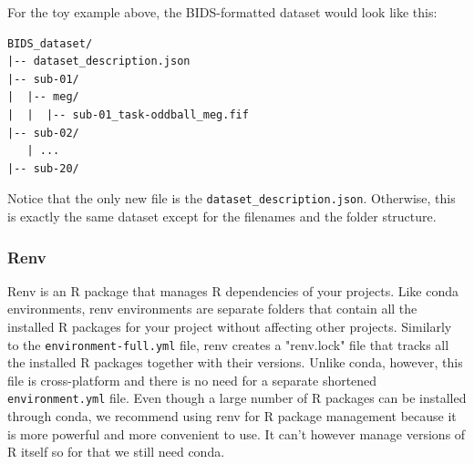 \documentclass[a4paper,man,floatsintext,natbib]{apa6}
\begin{document}
For the toy example above, the BIDS-formatted dataset would look like this:

\begin{verbatim}
BIDS_dataset/
|-- dataset_description.json
|-- sub-01/
|  |-- meg/
|  |  |-- sub-01_task-oddball_meg.fif
|-- sub-02/
   | ...
|-- sub-20/
\end{verbatim}

Notice that the only new file is the \verb|dataset_description.json|. Otherwise, this is exactly the same dataset except for the filenames and the folder structure.

\subsubsection{Renv}
Renv is an R package that manages R dependencies of your projects. Like conda environments, renv environments are separate folders that contain all the installed R packages for your project without affecting other projects. Similarly to the \verb|environment-full.yml| file, renv creates a "renv.lock" file that tracks all the installed R packages together with their versions. Unlike conda, however, this file is cross-platform and there is no need for a separate shortened \verb|environment.yml| file. Even though a large number of R packages can be installed through conda, we recommend using renv for R package management because it is more powerful and more convenient to use. It can't however manage versions of R itself so for that we still need conda.
\end{document}
